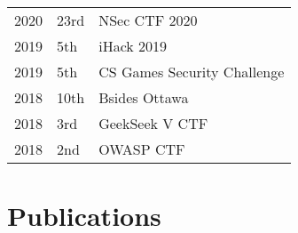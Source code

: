 \documentclass[]{deedy-resume-openfont}
\begin{document}
\begin{minipage}[t]{0.66\textwidth}
\begin{tabular}{rll}
2020      & 23rd & NSec CTF 2020\\

2019      & 5th & iHack 2019\\

2019      & 5th & CS Games Security Challenge\\

2018      & 10th & Bsides Ottawa\\

2018	     & 3rd & GeekSeek V CTF\\

2018	     & 2nd & OWASP CTF\\

\end{tabular}
\sectionsep


\section{Publications} 
\renewcommand\refname{\vskip -1.5em} %


\nocite{*}

\end{minipage} 
\end{document}
